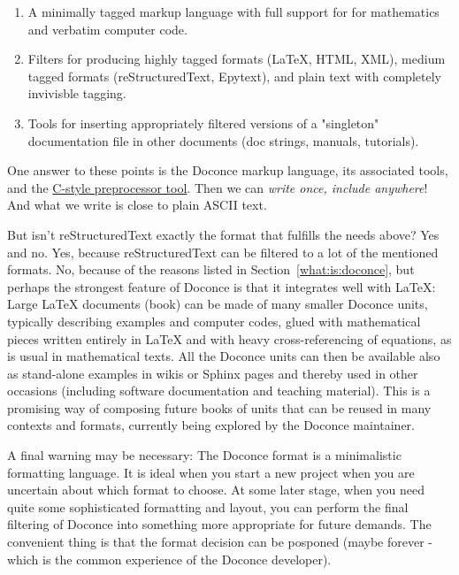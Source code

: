 \documentclass{article}
\begin{document}
\begin{enumerate}
 \item A minimally tagged markup language with full support for 
    for mathematics and verbatim computer code.

 \item Filters for producing highly tagged formats ({\LaTeX}, HTML, XML),
    medium tagged formats (reStructuredText, Epytext), and plain
    text with completely invivisble tagging. 

 \item Tools for inserting appropriately filtered versions of a "singleton"
    documentation file in other documents (doc strings, manuals, tutorials).
\end{enumerate}

\noindent
One answer to these points is the Doconce markup language, its associated
tools, and the \href{http://code.google.com/p/preprocess/}{C-style preprocessor tool}.
Then we can \emph{write once, include anywhere}!
And what we write is close to plain ASCII text.

But isn't reStructuredText exactly the format that fulfills the needs
above? Yes and no. Yes, because reStructuredText can be filtered to a
lot of the mentioned formats. No, because of the reasons listed
in Section~\ref{what:is:doconce}, but perhaps the strongest feature
of Doconce is that it integrates well with {\LaTeX}: Large {\LaTeX} documents (book)
can be made of many smaller Doconce units, typically describing examples
and computer codes, glued with mathematical pieces written entirely
in {\LaTeX} and with heavy cross-referencing of equations, as is usual
in mathematical texts. All the Doconce units can then be available
also as stand-alone examples in wikis or Sphinx pages and thereby used
in other occasions (including software documentation and teaching material).
This is a promising way of composing future books of units that can
be reused in many contexts and formats, currently being explored by
the Doconce maintainer.

A final warning may be necessary: The Doconce format is a minimalistic
formatting language. It is ideal when you start a new project when you
are uncertain about which format to choose. At some later stage, when
you need quite some sophisticated formatting and layout, you can
perform the final filtering of Doconce into something more appropriate
for future demands. The convenient thing is that the format decision
can be posponed (maybe forever - which is the common experience of the
Doconce developer).
\end{document}

